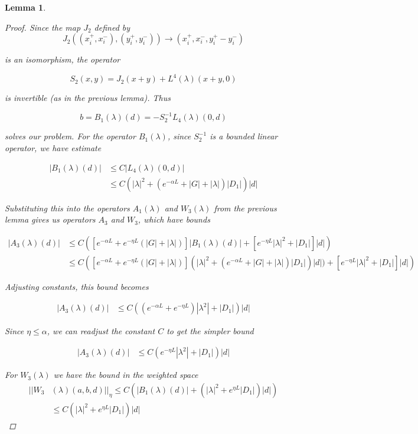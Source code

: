 \documentclass[12pt]{article}
\newtheorem{lemma}{Lemma}
\begin{document}
\begin{lemma}
\begin{proof}
Since the map $J_2$ defined by
\[
J_2( (x_i^+, x_i^-),(y_i^+, y_i^-)) \rightarrow ( x_i^+, x_i^-, y_i^+ -  y_i^- )
\]

is an isomorphism, the operator

\[
S_2(x,y) = J_2(x+y) + L^4(\lambda)(x+y,0)
\]

is invertible (as in the previous lemma). Thus

\[
b = B_1(\lambda)(d) = -S_2^{-1}L_4(\lambda)(0,d)
\]

solves our problem. For the operator $B_1(\lambda)$, since $S_2^{-1}$ is a bounded linear operator, we have estimate

\begin{align*}
|B_1(\lambda)(d)| &\leq C |L_4(\lambda)(0,d)| \\
&\leq C(|\lambda|^2 + (e^{-\alpha L} + |G| + |\lambda|)|D_1| )|d|
\end{align*}

Substituting this into the operators $A_1(\lambda)$ and $W_3(\lambda)$ from the previous lemma gives us operators $A_3$ and $W_3$, which have bounds

\begin{align*}
|A_3(\lambda)(d)| &\leq C\left( \left[e^{-\alpha L} + e^{-\eta L} \left(|G| + |\lambda|\right) \right]|B_1(\lambda)(d)| + \left[ e^{-\eta L} |\lambda|^2 + |D_1| \right] |d| \right)\\
&\leq C\left( \left[e^{-\alpha L} + e^{-\eta L} \left(|G| + |\lambda|\right) \right](|\lambda|^2 + (e^{-\alpha L} + |G| + |\lambda|)|D_1| )|d|)+ \left[ e^{-\eta L} |\lambda|^2 + |D_1| \right] |d| \right)
\end{align*}

Adjusting constants, this bound becomes

\begin{align*}
|A_3(\lambda)(d)| &\leq C\left( (e^{-\alpha L} + e^{-\eta L})|\lambda^2| + |D_1| \right)|d|
\end{align*}

Since $\eta \leq \alpha$, we can readjust the constant $C$ to get the simpler bound

\begin{align*}
|A_3(\lambda)(d)| &\leq C\left( e^{-\eta L}|\lambda^2| + |D_1| \right)|d|
\end{align*}


For $W_3(\lambda)$ we have the bound in the weighted space
\begin{align*}
||W_3&(\lambda)(a,b,d)||_\eta \leq C \left( |B_1(\lambda)(d)| + \left( |\lambda|^2 + e^{\eta L}|D_1| \right) |d|\right) \\
&\leq C \left( |\lambda|^2 + e^{\eta L}|D_1|\right)|d|
\end{align*} 


\end{proof}
\end{lemma}
\end{document}
